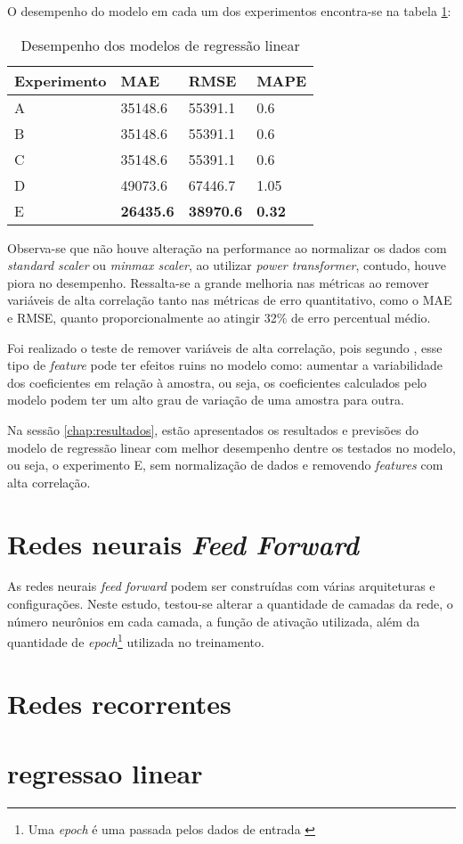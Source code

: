 O desempenho do modelo em cada um dos experimentos 
encontra-se na 
tabela \ref{tab:res_reg_lin}:

\begin{table}[H]
    \begin{tabular}{llll}
        \toprule
        Experimento & MAE     & RMSE    & MAPE \\
        \midrule
        A           & 35148.6 & 55391.1 & 0.6  \\
        B           & 35148.6 & 55391.1 & 0.6  \\
        C           & 35148.6 & 55391.1 & 0.6  \\
        D           & 49073.6 & 67446.7 & 1.05 \\
        E           & \textbf{26435.6} & \textbf{38970.6} & \textbf{0.32} \\
        \bottomrule
    \end{tabular}
    \caption{Desempenho dos modelos de regressão linear}
    \label{tab:res_reg_lin}
\end{table}

Observa-se que não houve alteração na performance ao normalizar 
os dados com \textit{standard scaler} ou \textit{minmax scaler},
ao utilizar \textit{power transformer}, contudo, houve piora 
no desempenho. Ressalta-se a grande melhoria nas métricas ao 
remover variáveis de alta correlação tanto nas métricas de erro 
quantitativo, como o MAE e RMSE, quanto proporcionalmente ao 
atingir 32\% de erro percentual médio.

Foi realizado o teste de remover variáveis de alta correlação, 
pois segundo \cite{corr_reg_lin}, esse tipo de \textit{feature}
pode ter efeitos ruins no modelo como: aumentar a variabilidade
dos coeficientes em relação à amostra, ou seja, os coeficientes 
calculados pelo modelo podem ter um alto grau de variação de uma 
amostra para outra.

Na sessão \ref{chap:resultados}, estão apresentados os 
resultados e previsões do modelo de regressão linear com
melhor desempenho dentre os testados no modelo, ou seja, o
experimento E, sem 
normalização de dados e removendo \textit{features} com alta 
correlação.

\section{Redes neurais \textit{Feed Forward}}

As redes neurais \textit{feed forward} podem ser construídas
com várias arquiteturas e configurações. Neste estudo, testou-se
alterar a quantidade de camadas da rede, o número neurônios em 
cada camada, a função de ativação utilizada, além da quantidade
de \textit{epoch}\footnote{Uma \textit{epoch} é uma passada 
pelos dados de entrada \cite{dl-oreilly}} utilizada no treinamento.



\section{Redes recorrentes}
\section{regressao linear}